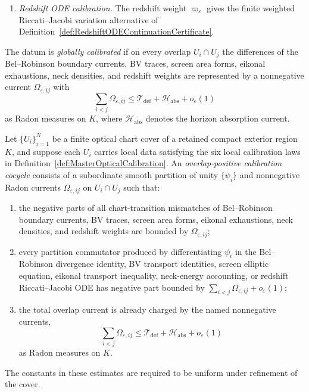\begin{definition}
\begin{enumerate}
\[        +
        |D^s\Pi_\varepsilon^{\wedge2}|
        +
        \mathcal T_{\mathrm{def}},
    \]
    and every nontrivial topological event carries $\mathfrak n_\varepsilon$-mass at least $\hbar_K>0$ on an annular generator neighborhood, as in Definition~\ref{def:ScreenNeckLowerBoundCertificate}.
    \item \emph{Redshift ODE calibration.} The redshift weight $\varpi_\varepsilon$ gives the finite weighted Riccati--Jacobi variation alternative of Definition~\ref{def:RedshiftODEContinuationCertificate}.
\end{enumerate}
The datum is \emph{globally calibrated} if on every overlap $U_i\cap U_j$ the differences of the Bel--Robinson boundary currents, BV traces, screen area forms, eikonal exhaustions, neck densities, and redshift weights are represented by a nonnegative current $\Omega_{\varepsilon,ij}$ with
\[
    \sum_{i<j}\Omega_{\varepsilon,ij}
    \le
    \mathcal T_{\mathrm{def}}+\mathcal H_{\mathrm{abs}}+o_\varepsilon(1)
\]
as Radon measures on $K$, where $\mathcal H_{\mathrm{abs}}$ denotes the horizon absorption current.
\end{definition}

\begin{definition}\label{def:OverlapPositiveCalibrationCocycle}
Let $\{U_i\}_{i=1}^N$ be a finite optical chart cover of a retained compact exterior region $K$, and suppose each $U_i$ carries local data satisfying the six local calibration laws in Definition~\ref{def:MasterOpticalCalibration}. An \emph{overlap-positive calibration cocycle} consists of a subordinate smooth partition of unity $\{\psi_i\}$ and nonnegative Radon currents $\Omega_{\varepsilon,ij}$ on $U_i\cap U_j$ such that:
\begin{enumerate}
    \item the negative parts of all chart-transition mismatches of Bel--Robinson boundary currents, BV traces, screen area forms, eikonal exhaustions, neck densities, and redshift weights are bounded by $\Omega_{\varepsilon,ij}$;
    \item every partition commutator produced by differentiating $\psi_i$ in the Bel--Robinson divergence identity, BV transport identities, screen elliptic equation, eikonal transport inequality, neck-energy accounting, or redshift Riccati--Jacobi ODE has negative part bounded by $\sum_{i<j}\Omega_{\varepsilon,ij}+o_\varepsilon(1)$;
    \item the total overlap current is already charged by the named nonnegative currents,
    \[
        \sum_{i<j}\Omega_{\varepsilon,ij}
        \le
        \mathcal T_{\mathrm{def}}+\mathcal H_{\mathrm{abs}}+o_\varepsilon(1)
    \]
    as Radon measures on $K$.
\end{enumerate}
The constants in these estimates are required to be uniform under refinement of the cover.
\end{definition}

